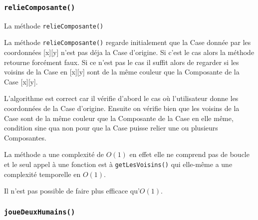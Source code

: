 \documentclass{article}
\newcommand{\info}{\texttt}
\begin{document}
            \subsubsection{\info{relieComposante()}}
                
                \begin{algorithm}[H]
                \caption{La méthode \info{relieComposante()}}
                \end{algorithm}
                
                La méthode \info{relieComposante()} regarde initialement que la Case donnée par les coordonnées [x][y] n'est pas déja la Case d'origine. Si c'est le cas alors la méthode retourne forcément faux. Si ce n'est pas le cas il suffit alors de regarder si les voisins de la Case en [x][y] sont de la même couleur que la Composante de la Case [x][y].
                
                L'algorithme est correct car il vérifie d'abord le cas où l'utilisateur donne les coordonnées de la Case d'origine. Ensuite on vérifie bien que les voisins de la Case sont de la même couleur que la Composante de la Case en elle même, condition sine qua non pour que la Case puisse relier une ou plusieurs Composantes.
                
                La méthode a une complexité de $O(1)$ en effet elle ne comprend pas de boucle et le seul appel à une fonction est à \info{getLesVoisins()} qui elle-même a une complexité temporelle en $O(1)$.
                
                Il n'est pas possible de faire plus efficace qu'$O(1)$.
                
            \subsubsection{\info{joueDeuxHumains()}}
            
\end{document}

